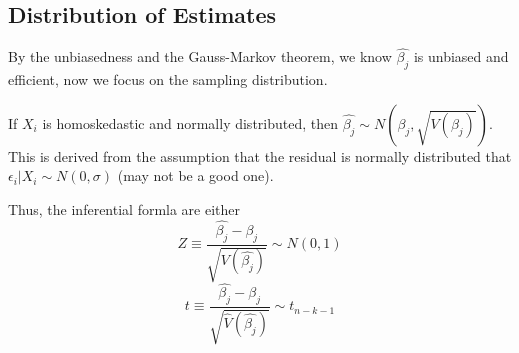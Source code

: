 \subsection{Distribution of Estimates}
By the unbiasedness and the Gauss-Markov theorem, we know $\hat{\beta_j}$ is unbiased and efficient, now we focus on the sampling distribution.

If $X_i$ is homoskedastic and normally distributed, then $\hat{\beta_j} \sim N(\beta_j, \sqrt{V(\beta_j)})$. This is derived from the assumption that the residual is normally distributed that $\epsilon_i | X_i \sim N(0, \sigma)$ (may not be a good one).

Thus, the inferential formla are either
$$Z \equiv \frac{\hat{\beta_j} - \beta_j}{\sqrt{V(\hat{\beta_j})}} \sim N(0, 1)$$
$$t \equiv \frac{\hat{\beta_j} - \beta_j}{\sqrt{\hat{V}(\hat{\beta_j})}} \sim t_{n - k - 1}$$

\newpage
